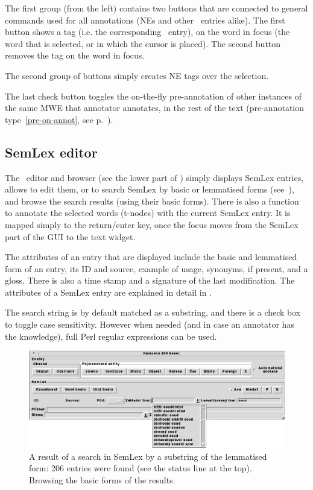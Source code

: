 The first group (from the left) contains two buttons that are connected to general commands used for all annotations (NEs and other \semlex\ entries alike). The first button shows a tag (i.e. the corresponding \semlex\ entry), on the word in focus (the word that is selected, or in which the cursor is placed). The second button removes the tag on the word in focus.

The second group of buttons simply creates NE tags over the selection. 

The last check button toggles the on-the-fly pre-annotation of other instances of the same MWE that annotator annotates, in the rest of the text (pre-annotation type~\ref{pre-on-annot}, see p.~\pageref{pre-on-annot}).



\subsection{SemLex editor}
The \semlex\ editor and browser (see the lower part of ) simply displays SemLex entries, allows to edit them, or to search SemLex by basic or lemmatised forms (see~), and browse the search results (using their basic forms). There is also a function to annotate the selected words (t-nodes) with the current SemLex entry. It is mapped simply to the return/enter key, once the focus moves from the SemLex part of the GUI to the text widget.

The attributes of an entry that are displayed include the basic and lemmatised form of an entry, its ID and source, example of usage, synonyms, if present, and a gloss. There is also a time stamp and a signature of the last modification. The attributes of a SemLex entry are explained in detail in .

The search string is by default matched as a substring, and there is a check box to toggle case sensitivity. However when needed (and in case an annotator has the knowledge), full Perl regular expressions can be used. 
\begin{figure}[htbp]
   \centering
   \includegraphics[width=\textwidth]{images/semlex-search}
   \caption{A result of a search in SemLex by a substring of the lemmatised form: 206 entries were found (see the status line at the top). Browsing the basic forms of the results.}
   \label{fig:semlex-search}
\end{figure}

